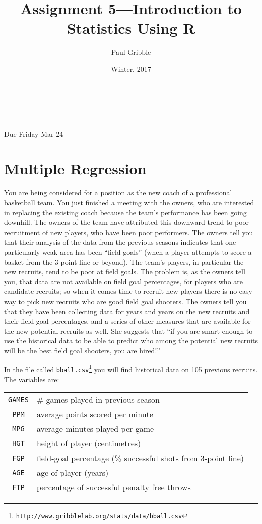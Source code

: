 \documentclass[10pt]{article}
\title{Assignment 5---Introduction to Statistics Using R}
\author{Paul Gribble}
\date{Winter, 2017}
\makeatletter
\renewcommand{\maketitle}{
\begin{flushleft}          %
{\Large\sffamily\bfseries\@title}   %
\vspace{3ex}\\            %
{\normalsize\sffamily\@author}           %
\vspace{0ex}\\             %
\normalsize\sffamily\@date                     %
\vspace{5ex}              %
\end{flushleft}
}
\makeatother
\begin{document}
\maketitle

\thispagestyle{empty}

{\flushleft \sffamily * Due Friday Mar 24}

\section{Multiple Regression}

You are being considered for a position as the new coach of a
professional basketball team. You just finished a meeting with the
owners, who are interested in replacing the existing coach because the
team’s performance has been going downhill. The owners of the team
have attributed this downward trend to poor recruitment of new
players, who have been poor performers. The owners tell you that their
analysis of the data from the previous seasons indicates that one
particularly weak area has been ``field goals'' (when a player
attempts to score a basket from the 3-point line or beyond). The
team’s players, in particular the new recruits, tend to be poor at
field goals. The problem is, as the owners tell you, that data are not
available on field goal percentages, for players who are candidate
recruits; so when it comes time to recruit new players there is no
easy way to pick new recruits who are good field goal shooters. The
owners tell you that they have been collecting data for years and
years on the new recruits and their field goal percentages, and a
series of other measures that are available for the new potential
recruits as well. She suggests that ``if you are smart enough to use
the historical data to be able to predict who among the potential new
recruits will be the best field goal shooters, you are hired!''

In the file called \texttt{bball.csv}\footnote{\texttt{http://www.gribblelab.org/stats/data/bball.csv}} you will find historical data on 105 previous
recruits. The variables are:

\begin{center}
\begin{tabular}{c|l}
	\texttt{GAMES} &\# games played in previous season \\
	\texttt{PPM}   &average points scored per minute \\
	\texttt{MPG}   &average minutes played per game \\
	\texttt{HGT}   &height of player (centimetres) \\
	\texttt{FGP}   &field-goal percentage (\% successful shots from 3-point line) \\
	\texttt{AGE}   &age of player (years) \\
	\texttt{FTP}   &percentage of successful penalty free throws \\	
\end{tabular}
\end{center}
\end{document}
